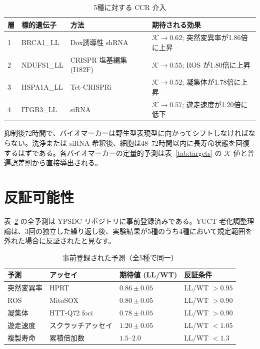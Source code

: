 \documentclass[12pt,a4paper]{ltjsarticle}
\newcommand{\REL}{\mathcal{K}}          %
\begin{document}
	\begin{table}[H]
		\centering
		\caption{5種に対する CCR 介入}
		\label{tab:CCR}
		\begin{tabular}{@{}llll@{}}
			\toprule
			\textbf{層} & \textbf{標的遺伝子} & \textbf{方法} & \textbf{期待される効果} \\
			\midrule
			1 & BRCA1\_LL & Dox誘導性 shRNA & \(\REL \to 0.62\); 突然変異率が1.86倍に上昇 \\
			2 & NDUFS1\_LL & CRISPR 塩基編集 (I182F) & \(\REL \to 0.55\); ROS が1.80倍に上昇 \\
			3 & HSPA1A\_LL & Tet‑CRISPRi & \(\REL \to 0.52\); 凝集体が1.78倍に上昇 \\
			4 & ITGB3\_LL & siRNA & \(\REL \to 0.57\); 遊走速度が1.20倍に低下 \\
			\bottomrule
		\end{tabular}
	\end{table}
	
	抑制後72時間で、バイオマーカーは野生型表現型に向かってシフトしなければならない。洗浄または siRNA 希釈後、細胞は48–72時間以内に長寿命状態を回復するはずである。各バイオマーカーの定量的予測は表~\ref{tab:targets} の \(\REL\) 値と普遍誤差則から直接導出される。
	
	\section{反証可能性}
	\label{sec:falsifiability}
	表~\ref{tab:predictions} の全予測は YPSDC リポジトリに事前登録済みである。YUCT 老化調整理論は、3回の独立した繰り返し後、実験結果が5種のうち4種において規定範囲を外れた場合に反証されたと見なす。
	
	\begin{table}[H]
		\centering
		\caption{事前登録された予測（全5種で同一）}
		\label{tab:predictions}
		\begin{tabular}{@{}llll@{}}
			\toprule
			\textbf{予測} & \textbf{アッセイ} & \textbf{期待値 (LL/WT)} & \textbf{反証条件} \\
			\midrule
			突然変異率       & HPRT           & \(0.86 \pm 0.05\) & LL/WT \(> 0.95\) \\
			ROS              & MitoSOX        & \(0.80 \pm 0.05\) & LL/WT \(> 0.90\) \\
			凝集体           & HTT‑Q72 foci   & \(0.78 \pm 0.05\) & LL/WT \(> 0.90\) \\
			遊走速度         & スクラッチアッセイ & \(1.20 \pm 0.05\) & LL/WT \(< 1.05\) \\
			複製寿命         & 累積倍加数     & \(1.5\)–\(2.0\)   & LL/WT \(< 1.3\) \\
			\bottomrule
		\end{tabular}
	\end{table}
	
\end{document}
